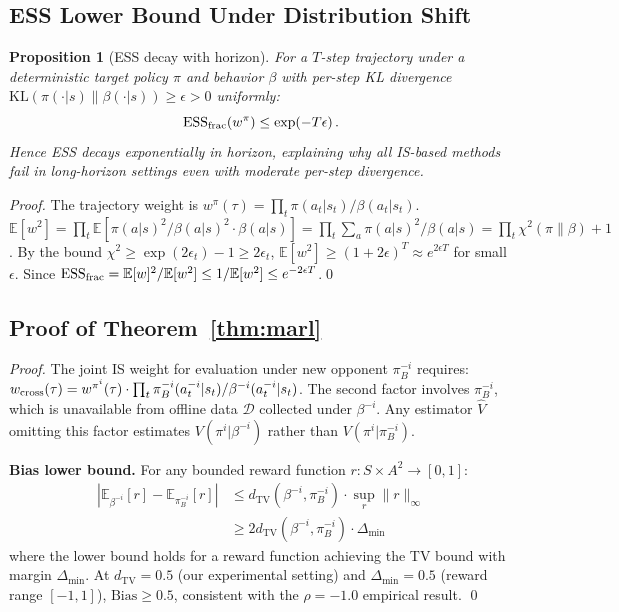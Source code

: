 \documentclass[10pt]{article}
\theoremstyle{plain}
\newtheorem{proposition}[theorem]{Proposition}
\theoremstyle{definition}
\theoremstyle{remark}
\newcommand{\E}{\mathbb{E}}
\newcommand{\ESS}{\mathrm{ESS}}
\newcommand{\TV}{d_{\mathrm{TV}}}
\newcommand{\calD}{\mathcal{D}}
\begin{document}
\subsection{ESS Lower Bound Under Distribution Shift}
\label{app:ess_lower_bound}

\begin{proposition}[ESS decay with horizon]
  \label{prop:ess_decay}
  For a $T$-step trajectory under a deterministic target policy $\pi$ and
  behavior $\beta$ with per-step KL divergence
  $\mathrm{KL}(\pi(\cdot|s)\|\beta(\cdot|s))\geq\epsilon>0$ uniformly:
  \begin{equation}
    \ESS_{\rm frac}(w^\pi) \leq \exp\!\left(-T\epsilon\right).
    \label{eq:ess_decay}
  \end{equation}
  Hence ESS decays \emph{exponentially} in horizon, explaining why all IS-based
  methods fail in long-horizon settings even with moderate per-step divergence.
\end{proposition}

\begin{proof}
  The trajectory weight is $w^\pi(\tau)=\prod_t\pi(a_t|s_t)/\beta(a_t|s_t)$.
  $\E[w^2]=\prod_t\E[\pi(a|s)^2/\beta(a|s)^2\cdot\beta(a|s)]
  =\prod_t\sum_a\pi(a|s)^2/\beta(a|s)=\prod_t\chi^2(\pi\|\beta)+1$.
  By the bound $\chi^2\geq\exp(2\epsilon_t)-1\geq 2\epsilon_t$,
  $\E[w^2]\geq(1+2\epsilon)^T\approx e^{2\epsilon T}$ for small $\epsilon$.
  Since $\ESS_{\rm frac}=\E[w]^2/\E[w^2]\leq 1/\E[w^2]\leq e^{-2\epsilon T}$.\qed
\end{proof}

\subsection{Proof of Theorem~\ref{thm:marl}}
\label{app:proof_thm2}

\begin{proof}
The joint IS weight for evaluation under new opponent $\pi^{-i}_B$ requires:
$w_{\rm cross}(\tau)=w^{\pi^i}(\tau)\cdot
\prod_t\pi^{-i}_B(a^{-i}_t|s_t)/\beta^{-i}(a^{-i}_t|s_t)$.
The second factor involves $\pi^{-i}_B$, which is unavailable from offline data
$\calD$ collected under $\beta^{-i}$.  Any estimator $\hat{V}$ omitting this
factor estimates $V(\pi^i|\beta^{-i})$ rather than $V(\pi^i|\pi^{-i}_B)$.

\textbf{Bias lower bound.}  For any bounded reward function $r:S\times A^2\to[0,1]$:
\begin{align}
  |\E_{\beta^{-i}}[r]-\E_{\pi^{-i}_B}[r]|
  &\leq \TV(\beta^{-i},\pi^{-i}_B)\cdot\sup_r\|r\|_\infty\\
  &\geq 2\TV(\beta^{-i},\pi^{-i}_B)\cdot\Delta_{\min}
\end{align}
where the lower bound holds for a reward function achieving the TV bound
with margin $\Delta_{\min}$.  At $\TV=0.5$ (our experimental setting) and
$\Delta_{\min}=0.5$ (reward range $[-1,1]$), $\text{Bias}\geq 0.5$, consistent
with the $\rho=-1.0$ empirical result. \qed
\end{proof}
\end{document}
